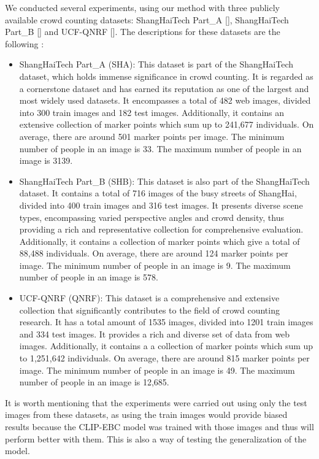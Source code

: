 
We conducted several experiments, using our method with three publicly available crowd counting datasets: ShangHaiTech Part\_A [\cite{shab}], ShangHaiTech Part\_B [\cite{shab}] and UCF-QNRF [\cite{qnrf}]. The descriptions for these datasets are the following \citep{FGENet}:

\begin{itemize}
    \item ShangHaiTech Part\_A (SHA): This dataset is part of the ShangHaiTech dataset, which holds immense significance in crowd counting. It is regarded as a cornerstone dataset and has earned its reputation as one of the largest and most widely used datasets. It encompasses a total of 482 web images, divided into 300 train images and 182 test images. Additionally, it contains an extensive collection of marker points which sum up to 241,677 individuals. On average, there are around 501 marker points per image. The minimum number of people in an image is 33. The maximum number of people in an image is 3139.
    \item ShangHaiTech Part\_B (SHB): This dataset is also part of the ShangHaiTech dataset. It contains a total of 716 images of the busy streets of ShangHai, divided into 400 train images and 316 test images. It presents diverse scene types, encompassing varied perspective angles and crowd density, thus providing a rich and representative collection for comprehensive evaluation. Additionally, it contains a collection of marker points which give a total of 88,488 individuals. On average, there are around 124 marker points per image. The minimum number of people in an image is 9. The maximum number of people in an image is 578.
    \item UCF-QNRF (QNRF): This dataset is a comprehensive and extensive collection that significantly contributes to the field of crowd counting research. It has a total amount of 1535 images, divided into 1201 train images and 334 test images. It provides a rich and diverse set of data from web images. Additionally, it contains a a collection of marker points which sum up to 1,251,642 individuals. On average, there are around 815 marker points per image. The minimum number of people in an image is 49. The maximum number of people in an image is 12,685.
\end{itemize}
It is worth mentioning that the experiments were carried out using only the test images from these datasets, as using the train images would provide biased results because the CLIP-EBC model was trained with those images and thus will perform better with them. This is also a way of testing the generalization of the model.\\


